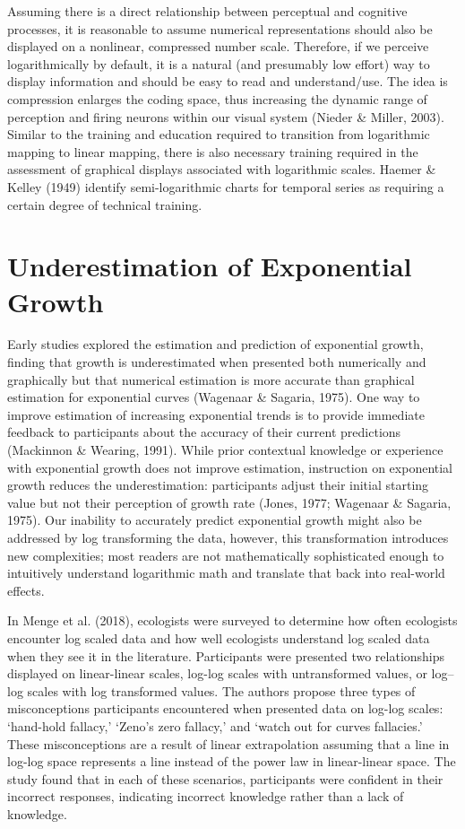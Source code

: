 \documentclass[print]{nuthesis}
\begin{document}
Assuming there is a direct relationship between perceptual and cognitive processes, it is reasonable to assume numerical representations should also be displayed on a nonlinear, compressed number scale. Therefore, if we perceive logarithmically by default, it is a natural (and presumably low effort) way to display information and should be easy to read and understand/use.
The idea is compression enlarges the coding space, thus increasing the dynamic range of perception and firing neurons within our visual system (Nieder \& Miller, 2003).
Similar to the training and education required to transition from logarithmic mapping to linear mapping, there is also necessary training required in the assessment of graphical displays associated with logarithmic scales. Haemer \& Kelley (1949) identify semi-logarithmic charts for temporal series as requiring a certain degree of technical training.

\hypertarget{underestimation-of-exponential-growth}{%
\section{Underestimation of Exponential Growth}\label{underestimation-of-exponential-growth}}

Early studies explored the estimation and prediction of exponential growth, finding that growth is underestimated when presented both numerically and graphically but that numerical estimation is more accurate than graphical estimation for exponential curves (Wagenaar \& Sagaria, 1975).
One way to improve estimation of increasing exponential trends is to provide immediate feedback to participants about the accuracy of their current predictions (Mackinnon \& Wearing, 1991).
While prior contextual knowledge or experience with exponential growth does not improve estimation, instruction on exponential growth reduces the underestimation: participants adjust their initial starting value but not their perception of growth rate (Jones, 1977; Wagenaar \& Sagaria, 1975).
Our inability to accurately predict exponential growth might also be addressed by log transforming the data, however, this transformation introduces new complexities; most readers are not mathematically sophisticated enough to intuitively understand logarithmic math and translate that back into real-world effects.

In Menge et al. (2018), ecologists were surveyed to determine how often ecologists encounter log scaled data and how well ecologists understand log scaled data when they see it in the literature.
Participants were presented two relationships displayed on linear-linear scales, log-log scales with untransformed values, or log--log scales with log transformed values.
The authors propose three types of misconceptions participants encountered when presented data on log-log scales: `hand-hold fallacy,' `Zeno's zero fallacy,' and `watch out for curves fallacies.'
These misconceptions are a result of linear extrapolation assuming that a line in log-log space represents a line instead of the power law in linear-linear space.
The study found that in each of these scenarios, participants were confident in their incorrect responses, indicating incorrect knowledge rather than a lack of knowledge.
\end{document}
